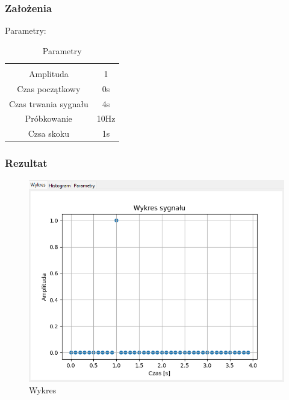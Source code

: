 \documentclass{article}
\begin{document}
\subsubsection{Założenia}
\noindent
Parametry:
\begin{table}[h!]
    \centering
    \vspace{0.2cm}
    \begin{tabular}{|c|c|}
        \hline\hline\\[-0.4cm]
        Amplituda & 1  \\
        \hline
        Czas początkowy & 0s  \\
        \hline
        Czas trwania sygnału & 4s  \\
        \hline
        Próbkowanie & 10Hz \\
        \hline
        Czsa skoku & 1s\\
        \hline
    \end{tabular}
    \caption{Parametry}
    \label{impuls}
\end{table}
\subsubsection{Rezultat}
\begin{figure}[h!]
    \centering
    \includegraphics[width=\textwidth]{img/impuls/wykres.png}
    \caption{Wykres}
\end{figure}
\end{document}
